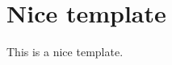 \documentclass{Skoltech}
\begin{document}
\section{Nice template} 

This is a nice template.
\end{document}
